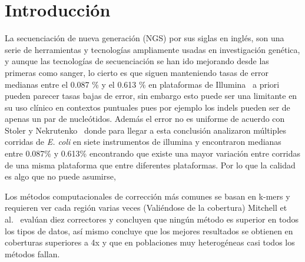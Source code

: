 \documentclass[sigconf,nonacm]{acmart}
\begin{document}

\maketitle
\renewcommand{\shortauthors}{Manzano Piñeros, Escalante Perez y Babativa Santos}

\section{Introducción}\label{sec:introduccion}

La secuenciación de nueva generación (NGS) por sus siglas en inglés, son una serie de herramientas y tecnologías ampliamente usadas en investigación genética, y aunque las tecnologías de secuenciación se han ido mejorando desde las primeras como sanger, lo cierto es que siguen manteniendo tasas de error medianas entre el 0.087 \% y el 0.613 \% en plataformas de Illumina~\cite{stoler2021sequencing} a priori pueden parecer tasas bajas de error, sin embargo esto puede ser una limitante en su uso clínico en contextos puntuales pues por ejemplo los indels pueden ser de apenas un par de nucleótidos. Además el error no es uniforme de acuerdo con Stoler y Nekrutenko~\cite{stoler2021sequencing} donde para llegar a esta conclusión analizaron múltiples corridas de \emph{E. coli} en siete instrumentos de illumina y encontraron medianas entre 0.087\% y 0.613\% encontrando que existe una mayor variación entre corridas de una misma plataforma que entre diferentes plataformas. Por lo que la calidad es algo que no puede asumirse,

Los métodos computacionales de corrección más comunes se basan en k-mers y requieren ver cada región varias veces (Valiéndose de la cobertura) Mitchell et al.~\cite{mitchell2020benchmarking} evalúan diez correctores y concluyen que ningún método es superior en todos los tipos de datos, así mismo concluye que los mejores resultados se obtienen en coberturas superiores a 4x y que en poblaciones muy heterogéneas casi todos los métodos fallan.
\end{document}
